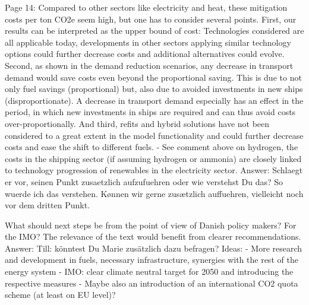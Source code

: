 Page 14: Compared to other sectors like electricity and heat, these mitigation costs per ton CO2e seem high, but one has to consider several points. First, our results can be interpreted as the upper bound of cost: Technologies considered are all applicable today, developments in other sectors applying similar technology options could further decrease costs and additional alternatives could evolve. Second, as shown in the demand reduction scenarios, any decrease in transport demand would save costs even beyond the proportional saving. This is due to not only fuel savings (proportional) but, also due to avoided investments in new ships (disproportionate). A decrease in transport demand especially has an effect in the period, in which new investments in ships are required and can thus avoid costs over-proportionally. And third, refits and hybrid solutions have not been considered to a great extent in the model functionality and could further decrease costs and ease the shift to different fuels. 
-	See comment above on hydrogen, the costs in the shipping sector (if assuming hydrogen or ammonia) are closely linked to technology progression of renewables in the electricity sector.
Answer: Schlaegt er vor, seinen Punkt zusaetzlich aufzufuehren oder wie verstehst Du das? So wuerde ich das verstehen. Kønnen wir gerne zusætzlich auffuehren, vielleicht noch vor dem dritten Punkt.

What should next steps be from the point of view of Danish policy makers? For the IMO? The relevance of the text would benefit from clearer recommendations. 
Answer: Till: könntest Du Marie zusätzlich dazu befragen?
Ideas:
- More research and development in fuels, necessary infrastructure, synergies with the rest of the energy system
- IMO: clear climate neutral target for 2050 and introducing the respective measures
- Maybe also an introduction of an international CO2 quota scheme (at least on EU level)?



